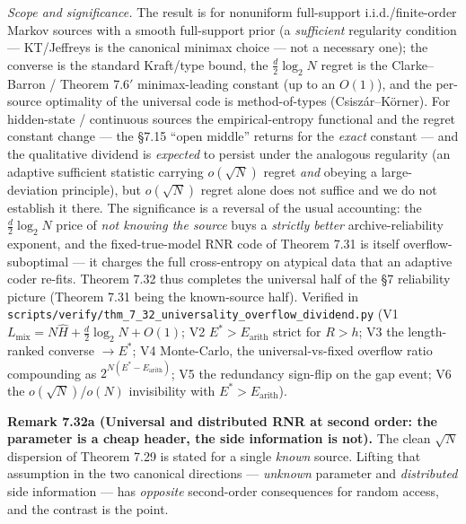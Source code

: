 \documentclass[
]{article}
\begin{document}
\emph{Scope and significance.} The result is for nonuniform full-support
i.i.d./finite-order Markov sources with a smooth full-support prior (a
\emph{sufficient} regularity condition --- KT/Jeffreys is the canonical minimax
choice --- not a necessary one); the converse is the standard Kraft/type bound, the
$\tfrac d2\log_2 N$ regret is the Clarke--Barron / Theorem 7.6$'$ minimax-leading
constant (up to an $O(1)$), and the per-source optimality of the universal code is
method-of-types (Csisz\'ar--K\"orner). For hidden-state / continuous sources the
empirical-entropy functional and the regret constant change --- the §7.15 ``open
middle'' returns for the \emph{exact} constant --- and the qualitative dividend is
\emph{expected} to persist under the analogous regularity (an adaptive sufficient
statistic carrying $o(\sqrt N)$ regret \emph{and} obeying a large-deviation
principle), but $o(\sqrt N)$ regret alone does not suffice and we do not establish it
there. The significance is a reversal of the usual
accounting: the $\tfrac d2\log_2 N$ price of \emph{not knowing the source} buys a
\emph{strictly better} archive-reliability exponent, and the fixed-true-model RNR
code of Theorem 7.31 is itself overflow-suboptimal --- it charges the full
cross-entropy on atypical data that an adaptive coder re-fits. Theorem 7.32 thus
completes the universal half of the §7 reliability picture (Theorem 7.31 being the
known-source half). Verified in
\texttt{scripts/verify/thm\_7\_32\_universality\_overflow\_dividend.py} (V1
$L_{\mathrm{mix}}=N\widehat H+\tfrac d2\log_2 N+O(1)$; V2 $E^\ast>E_{\mathrm{arith}}$
strict for $R>h$; V3 the length-ranked converse $\to E^\ast$; V4 Monte-Carlo, the
universal-vs-fixed overflow ratio compounding as $2^{N(E^\ast-E_{\mathrm{arith}})}$;
V5 the redundancy sign-flip on the gap event; V6 the $o(\sqrt N)$/$o(N)$ invisibility
with $E^\ast>E_{\mathrm{arith}}$).

\textbf{Remark 7.32a (Universal and distributed RNR at second order: the parameter is
a cheap header, the side information is not).} The clean $\sqrt N$ dispersion of
Theorem 7.29 is stated for a single \emph{known} source. Lifting that assumption in
the two canonical directions --- \emph{unknown} parameter and \emph{distributed} side
information --- has \emph{opposite} second-order consequences for random access, and
the contrast is the point.
\end{document}
